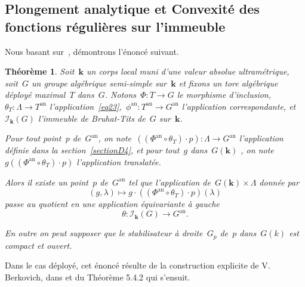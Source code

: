 \documentclass[french]{amsart}
\newcommand{\kk}{\mathbf{k}}
\newcommand{\Ik}{\mathscr{I}_\kk}
\newcommand{\an}{\textrm{an}}
\newtheorem{theoreme}{Théorème}[section]
\begin{document}
\subsection{Plongement analytique et Convexité des fonctions régulières sur l'immeuble} Nous basant sur~\cite{RTW09}, démontrons l'énoncé suivant.
\begin{theoreme}\label{TheoF3}
Soit~$\kk$ un corps local muni d'une valeur absolue ultramétrique, soit~$G$ un groupe algébrique semi-simple sur~$\kk$ et fixons un tore
algébrique déployé maximal~$T$ dans~$G$. Notons~$\Phi : T \rightarrow G$ le morphisme
d'inclusion, $\theta_T : \Lambda \rightarrow T^\an$ l'application~\eqref{eq23},~$\phi^\an : T^\an \rightarrow G^\an$ l'application correspondante, et~$\Ik(G)$ l'immeuble de Bruhat-Tits de~$G$ sur~$\kk$. 

Pour tout point~$p$ de~$G^\an$, on note~$((\Phi^\an \circ \theta_T )\cdot p) : \Lambda \rightarrow G^\an$ l'application définie dans la
section~\ref{sectionD4}, et pour tout~$g$ dans~$G(\kk)$ , on note~$g((\Phi^\an \circ \theta_T )\cdot p)$ l'application
translatée.

Alors il existe un point~$p$ de~$G^\an$ tel que l'application de~$G(\kk) \times \Lambda$ donnée
par
\begin{equation}\label{eq29}
(g,\lambda)\mapsto g\cdot ((\Phi^\an\circ \theta_T)\cdot p)(\lambda)
\end{equation}
passe au quotient en une application équivariante à gauche
\[
\theta:\Ik(G)\rightarrow G^\an.
\]

En outre on peut supposer que le stabilisateur à droite~$G_p$ de~$p$ dans~$G(k)$ est compact et ouvert.
\end{theoreme}


Dans le cas déployé, cet énoncé résulte de la construction explicite de V. Ber\-ko\-vich, dans \cite[5.3]{Ber90} et du Théorème 5.4.2 qui s'ensuit.
\end{document}
